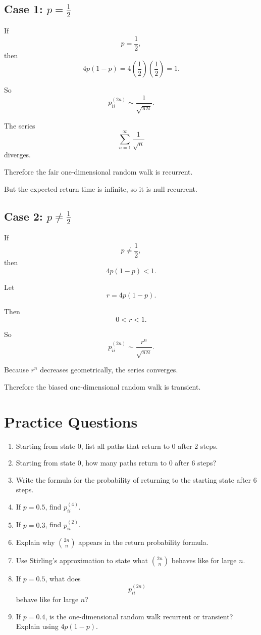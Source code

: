 \documentclass[12pt,a4paper]{article}
\theoremstyle{notestyle}
\begin{document}
\subsection*{Case 1: $p=\frac12$}

If
\[
p=\frac12,
\]
then
\[
4p(1-p)
=
4\left(\frac12\right)\left(\frac12\right)
=1.
\]

So
\[
p_{ii}^{(2n)}
\sim
\frac1{\sqrt{\pi n}}.
\]

The series
\[
\sum_{n=1}^{\infty}\frac1{\sqrt{n}}
\]
diverges.

Therefore the fair one-dimensional random walk is recurrent.

But the expected return time is infinite, so it is null recurrent.

\subsection*{Case 2: $p\neq\frac12$}

If
\[
p\neq\frac12,
\]
then
\[
4p(1-p)<1.
\]

Let
\[
r=4p(1-p).
\]

Then
\[
0<r<1.
\]

So
\[
p_{ii}^{(2n)}
\sim
\frac{r^n}{\sqrt{\pi n}}.
\]

Because $r^n$ decreases geometrically, the series converges.

Therefore the biased one-dimensional random walk is transient.

\section{Practice Questions}

\begin{enumerate}[label=\textbf{Q\arabic*.}, leftmargin=1.2cm]
    \item Starting from state $0$, list all paths that return to $0$ after 2 steps.

    \item Starting from state $0$, how many paths return to $0$ after 6 steps?

    \item Write the formula for the probability of returning to the starting state after 6 steps.

    \item If $p=0.5$, find $p_{ii}^{(4)}$.

    \item If $p=0.3$, find $p_{ii}^{(2)}$.

    \item Explain why $\binom{2n}{n}$ appears in the return probability formula.

    \item Use Stirling's approximation to state what $\binom{2n}{n}$ behaves like for large $n$.

    \item If $p=0.5$, what does
    \[
    p_{ii}^{(2n)}
    \]
    behave like for large $n$?

    \item If $p=0.4$, is the one-dimensional random walk recurrent or transient? Explain using $4p(1-p)$.
\end{enumerate}
\end{document}
